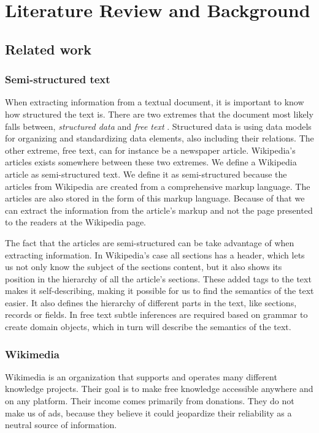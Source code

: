 
\chapter{Literature Review and Background} \label{cap_2}

\section{Related work}

\subsection{Semi-structured text}
When extracting information from a textual document, it is important to know how structured the text is. There are two extremes that the document most likely falls between, \textit{structured data} and \textit{free text}  \cite{semi-struc-text}. Structured data is using data models for organizing and standardizing data elements, also including their relations. The other extreme, free text, can for instance be a newspaper article. Wikipedia's articles exists somewhere between these two extremes. We define a Wikipedia article as semi-structured text. We define it as semi-structured because the articles from Wikipedia are created from a comprehensive markup language. The articles are also stored in the form of this markup language. Because of that we can extract the information from the article's markup and not the page presented to the readers at the Wikipedia page. 

The fact that the articles are semi-structured can be take advantage of when extracting information. In Wikipedia's case all sections has a header, which lets us not only know the subject of the sections content, but it also shows its position in the hierarchy of all the article's sections. These added tags to the text makes it self-describing, making it possible for us to find the semantics of the text easier. It also defines the hierarchy of different parts in the text, like sections, records or fields. In free text subtle inferences are required based on grammar to create domain objects, which in turn will describe the semantics of the text. 

\subsection{Wikimedia} \label{wikimedia}
Wikimedia \cite{wikimedia} is an organization that supports and operates many different knowledge projects. Their goal is to make free knowledge accessible anywhere and on any platform. Their income comes primarily from donations. They do not make us of ads, because they believe it could jeopardize their reliability as a neutral source of information.


